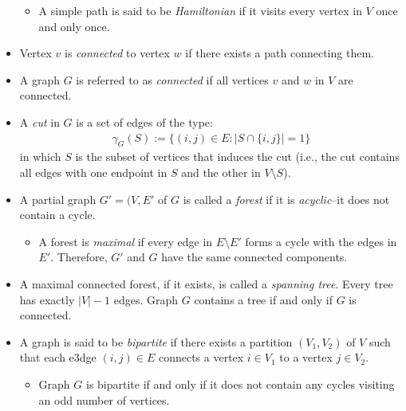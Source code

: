 \documentclass[12pt]{article}
\theoremstyle{definition}
\begin{document}
\begin{itemize}
\begin{itemize}
		\item A simple path is said to be \emph{Hamiltonian} if it visits every vertex in $V$ once and only once.
	\end{itemize}
	\item Vertex $v$ is \emph{connected} to vertex $w$ if there exists a path connecting them. 
	\item A graph $G$ is referred to as \emph{connected} if all vertices $v$ and $w$ in $V$ are connected.
	\item  A \emph{cut} in $G$ is a set of edges of the type:
		\begin{align*}
			\gamma_G(S):= \{(i,j) \in E: |S \cap \{i,j\} | = 1\}
		\end{align*}
	in which $S$ is the subset of vertices that induces the cut (i.e., the cut contains all edges with one endpoint in $S$ and the other in $V \setminus S$). 
	\item A partial graph $G' = (V, E'$ of $G$ is called a \emph{forest} if it is \emph{acyclic}--it does not contain a cycle. 
	\begin{itemize}
		\item A forest is \emph{maximal} if every edge in $E \setminus E'$ forms a cycle with the edges in $E'$. Therefore, $G'$ and $G$ have the same connected components. 
	\end{itemize}
	\item A maximal connected forest, if it exists, is called a \emph{spanning tree}. Every tree has exactly $|V| - 1$ edges. Graph $G$ contains a tree if and only if $G$ is connected. 
	\item A graph is said to be \emph{bipartite} if there exists a partition $(V_1, V_2)$ of $V$ such that each e3dge $(i,j) \in E$ connects a vertex $i \in V_1$ to a vertex $j \in V_2$. 
	\begin{itemize}
		\item Graph $G$ is bipartite if and only if it does not contain any cycles visiting an odd number of vertices.
	\end{itemize}
\end{itemize}
\end{document}
